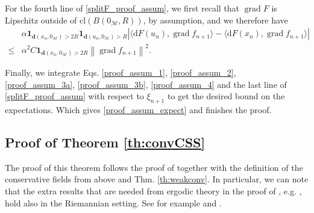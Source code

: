 \documentclass{article}
\newtheorem{proposition}{Proposition}
\newcommand{\CM}{\mathcal{M}}
\newcommand{\BR}{\mathbb{R}}
\newcommand{\rd}{\mathrm{d}}
\newcommand{\bd}{\mathbf{d}}
\DeclareMathOperator{\grad}{grad}
\newcommand{\norm}[1]{\left\lVert#1\right\rVert}
\begin{document}
For the fourth line of \eqref{splitF_proof_assum}, we first recall that $\grad F$ is Lipschitz outside of $\text{cl}(B(0_\CM,R))$, by assumption, and we therefore have
\begin{equation}\label{proof_assum_4}
    \begin{aligned}
        &\alpha\mathbf{1}_{\bd(x_n,0_\CM)>2R}\mathbf{1}_{\bd(u_n,0_\CM)>R}|\langle\rd F(u_n),\grad f_{n+1}\rangle-\langle\rd F(x_n),\grad f_{n+1}\rangle|\\\leq& \alpha^2 C\mathbf{1}_{\bd(x_n,0_\CM)>2R}\norm{\grad f_{n+1}}^2.
    \end{aligned}
\end{equation}

Finally, we integrate Eqs. \eqref{proof_assum_1}, \eqref{proof_assum_2}, \eqref{proof_assum_3a}, \eqref{proof_assum_3b}, \eqref{proof_assum_4} and the last line of \eqref{splitF_proof_assum} with respect to $\xi_{n+1}$ to get the desired bound on the expectations. Which gives \eqref{proof_assum_expect} and finishes the proof. 

\subsection{Proof of Theorem \ref{th:convCSS}}
The proof of this theorem follows the proof of \cite[Thm. 3]{bianchi2022convergence} together with the definition of the conservative fields from above and Thm. \ref{th:weakconv}. In particular, we can note that the extra results that are needed from ergodic theory in the proof of \cite[Thm. 3]{bianchi2022convergence}, e.g. \cite[Prop. 8 and Prop. 10]{bianchi2022convergence}, hold also in the Riemannian setting. See for example \cite[Thm. 13.0.1]{meyn2012markov} and \cite{faure2013ergodic}. 





\end{document}
